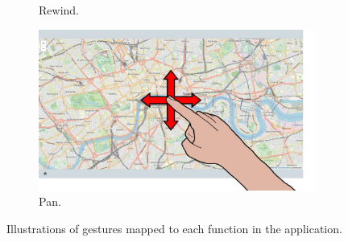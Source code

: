\begin{figure}[ht]
\begin{subfigure}{.24\textwidth}
        \vspace{-6pt}
        \captionsetup{width=.9\linewidth}
        \caption{Rewind.}
        \label{fig:lui:gestures:rewind}
    \end{subfigure}
    \begin{subfigure}{.24\textwidth}
        \centering
        \includegraphics[width=.97\linewidth]{Figures/LUI/Gestures/pan.pdf}  
        \vspace{-6pt}
        \captionsetup{width=.9\linewidth}
        \caption{Pan.}
        \label{fig:lui:gestures:pan}
    \end{subfigure}
    \caption{Illustrations of gestures mapped to each function in the \lui application.}
    \label{fig:lui:gestures}
\end{figure}

